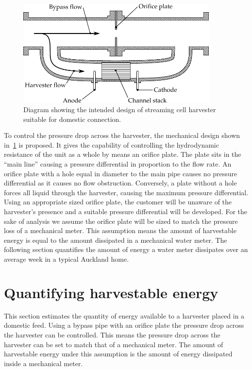     \begin{figure}
      \centering
      \includegraphics[width=0.9\textwidth]{content/pt1/02-WirelessWaterMeter/graphics/harvester}
      \caption{\label{fig:Diagram_harvester}Diagram showing the intended design of streaming cell harvester suitable for domestic connection.}
    \end{figure}
    To control the pressure drop across the harvester, the mechanical design shown in~\cref{fig:Diagram_harvester} is proposed.
    It gives the capability of controlling the hydrodynamic resistance of the unit as a whole by means an orifice plate.
    The plate sits in the ``main line'' causing a pressure differential in proportion to the flow rate.
    An orifice plate with a hole equal in diameter to the main pipe causes no pressure differential as it causes no flow obstruction.
    Conversely, a plate without a hole forces all liquid through the harvester, causing the maximum pressure differential.
    Using an appropriate sized orifice plate, the customer will be unaware of the harvester's presence and a suitable pressure differential will be developed.
    For the sake of analysis we assume the orifice plate will be sized to match the pressure loss of a mechanical meter.
    This assumption means the amount of harvestable energy is equal to the amount dissipated in a mechanical water meter.
    The following section quantifies the amount of energy a water meter dissipates over an average week in a typical Auckland home.


  \section{Quantifying harvestable energy}
  \label{sect:part1-WirelessWaterMeter-QuantifyingHarvestableEnergy}

    This section estimates the quantity of energy available to a harvester placed in a domestic feed.
    Using a bypass pipe with an orifice plate the pressure drop across the harvester can be controlled.
    This means the pressure drop across the harvester can be set to match that of a mechanical meter.
    The amount of harvestable energy under this assumption is the amount of energy dissipated inside a mechanical meter.


